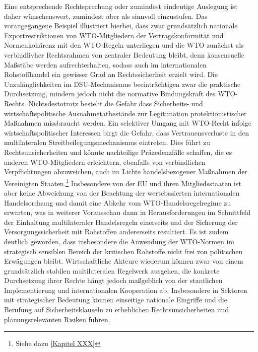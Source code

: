 \documentclass[12pt,a4paper,oneside]{book} %
\begin{document}
Eine entsprechende Rechtsprechung oder zumindest eindeutige Auslegung ist daher wünschenswert, zumindest aber als sinnvoll einzustufen.
Das vorangegangene Beispiel illustriert hierbei, dass zwar grundsätzlich nationale Exportrestriktionen von WTO-Mitgliedern der Vertragskonformität und Normenkohärenz mit den WTO-Regeln unterliegen und die WTO zunächst als verbindlivher Rechtsrahmen von zentraler Bedeutung bleibt, denn konsensuelle Maßstäbe werden aufrechterhalten, sodass auch im internationalen Rohstoffhandel ein gewisser Grad an Rechtssicherheit erzielt wird. Die Unzulänglichkeiten im DSU-Mechanismus beeinträchtigen zwar die praktische Durchsetzung, mindern jedoch nicht die normative Bindungskraft des WTO-Rechts. Nichtsdestotrotz besteht die Gefahr dass Sicherheits- und wirtschaftspolitische Ausnahmetatbestände zur Legitimation protektionistischer Maßnahmen missbraucht werden. Ein selektiver Umgang mit WTO-Recht infolge wirtschaftspolitischer Interessen birgt die Gefahr, dass Vertrauensverluste in den multilateralen Streitbeilegungsmechanismus eintreten. Dies führt zu Rechtsunsicherheiten und könnte nachteilige Präzedenzfälle schaffen, die es anderen WTO-Mitgliedern erleichtern, ebenfalls von verbindlichen Verpflichtungen abzuweichen, auch im Lichte handelsbezogener Maßnahmen der Vereinigten Staaten.\footnote{Siehe dazu \ref{Kapitel XXX}} Insbesondere von der EU und ihren Mitgliedsstaaten ist aber keine Abweichung von der Beachtung der wertebasierten internationalen Handelsordnung und damit eine Abkehr vom WTO-Handelsregelregime zu erwarten, was in weiterer Vorausschau dann in Herausforderungen im Schnittfeld der Einhaltung multilateraler Handelsregeln einerseits und der Sicherung der Versorgungssicherheit mit Rohstoffen andererseits resultiert. Es ist zudem deutlich geworden, dass insbesondere die Anwendung der WTO-Normen im strategisch sensiblen Bereich der kritischen Rohstoffe nicht frei von politischen Erwägungen bleibt. Wirtschaftliche Akteure wiederum können zwar von einem grundsätzlich stabilen multilateralen Regelwerk ausgehen, die konkrete Durchsetzung ihrer Rechte hängt jedoch maßgeblich von der staatlichen Implementierung und internationalen Kooperation ab. Insbesondere in Sektoren mit strategischer Bedeutung können einseitige nationale Eingriffe und die Berufung auf Sicherheitsklauseln zu erheblichen Rechtsunsicherheiten und planungsrelevanten Risiken führen.
\end{document}
